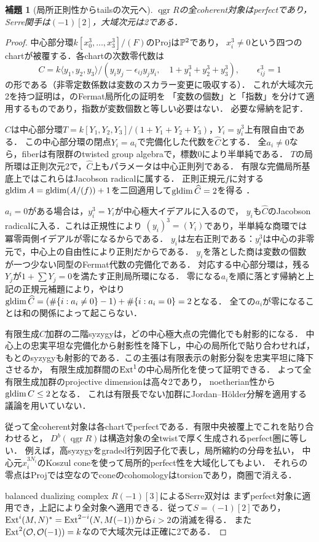 \documentclass[11pt,a4paper]{ltjsarticle}
\newtheorem{lemma}[theorem]{補題}
\theoremstyle{definition}\newtheorem{definition}[theorem]{定義}
\newcommand{\OO}{\mathcal O}\newcommand{\cA}{\mathcal A}
\newcommand{\qgr}{\operatorname{qgr}}\newcommand{\Gr}{\operatorname{Gr}}
\begin{document}
\begin{lemma}[局所正則性からtailsの次元へ]\label{lem:smooth}
$\qgr R$の全coherent対象はperfectであり，Serre関手は$(-1)[2]$，大域次元は2である．
\end{lemma}
\begin{proof}
中心部分環$k[x_0^3,\ldots,x_3^3]/(F)$のProjは$\mathbb P^2$であり，
$x_i^3\ne0$という四つのchartが被覆する．各chartの次数零代数は
\begin{equation}\label{eq:affine-fermat}
 C=k\langle y_1,y_2,y_3\rangle/
 (y_iy_j-\epsilon_{ij}y_jy_i,\quad 1+y_1^3+y_2^3+y_3^3),
 \qquad \epsilon_{ij}^3=1
\end{equation}
の形である（非零定数係数は変数のスカラー変更に吸収する）．
これが大域次元2を持つ証明は，\cite[\S2.3]{Kanazawa}のFermat局所化の証明を
「変数の個数」と「指数」を分けて適用するものであり，指数が変数個数と等しい必要はない．
必要な帰納を記す．

$C$は中心部分環$T=k[Y_1,Y_2,Y_3]/(1+Y_1+Y_2+Y_3)$，$Y_i=y_i^3$上有限自由である．
この中心部分環の閉点$Y_i=a_i$で完備化した代数を$\widehat C$とする．
全$a_i\ne0$なら，fiberは有限群のtwisted group algebraで，標数0により半単純である．
$T$の局所環は正則次元2で，$\widehat C$上もパラメータは中心正則列である．
有限な完備局所基底上ではこれらはJacobson radicalに属する．
正則正規元$f$に対する
$\operatorname{gldim} A=\operatorname{gldim}(A/(f))+1$を二回適用して$\operatorname{gldim}\widehat C=2$を得る
\cite[Lemma 2.8]{Kanazawa}．

$a_i=0$がある場合は，$y_i^3=Y_i$が中心極大イデアルに入るので，
$y_i$も$\widehat C$のJacobson radicalに入る．これは正規性により
$(y_i)^3=(Y_i)$であり，半単純な商環では冪零両側イデアルが零になるからである．
$y_i$は左右正則である：$y_i^3$は中心の非零元で，中心上の自由性により正則だからである．
$y_i$を落とした商は変数の個数が一つ少ない同型のFermat代数の完備化である．
対応する中心部分環は，残る$Y_j$が$1+\sum Y_j=0$を満たす正則局所環になる．
零になる$a_i$を順に落とす帰納と上記の正規元補題により，やはり
$\operatorname{gldim}\widehat C=(\#\{i:a_i\ne0\}-1)+\#\{i:a_i=0\}=2$となる．
全ての$a_i$が零になることは和の関係によって起こらない．

有限生成$C$加群の二階syzygyは，どの中心極大点の完備化でも射影的になる．
中心上の忠実平坦な完備化から射影性を降下し，中心の局所化で貼り合わせれば，
もとのsyzygyも射影的である．この主張は有限表示の射影分裂を忠実平坦に降下させるか，
有限生成加群間の$\operatorname{Ext}^1$の中心局所化を使って証明できる．
よって全有限生成加群のprojective dimensionは高々2であり，
noetherian性から$\operatorname{gldim} C\le2$となる．
これは有限長でない加群にJordan--H\"older分解を適用する議論を用いていない．

従って全coherent対象は各chartでperfectである．有限中央被覆上でこれを貼り合わせると，
$D^b(\qgr R)$は構造対象の全twistで厚く生成されるperfect圏に等しい．
例えば，高syzygyをgraded行列因子化で表し，局所縮約の分母を払い，
中心元$x_i^{3N_i}$のKoszul coneを使って局所的perfect性を大域化してもよい．
それらの零点はProjでは空なのでconeのcohomologyはtorsionであり，商圏で消える．

balanced dualizing complex $R(-1)[3]$によるSerre双対\cite{YZ}は
まずperfect対象に適用でき，上記により全対象へ適用できる．従って$S=(-1)[2]$であり，
$\operatorname{Ext}^i(M,N)^*=\operatorname{Ext}^{2-i}(N,M(-1))$から$i>2$の消滅を得る．
また$\Ext^2(\OO,\OO(-1))=k$なので大域次元は正確に2である．
\end{proof}
\end{document}
